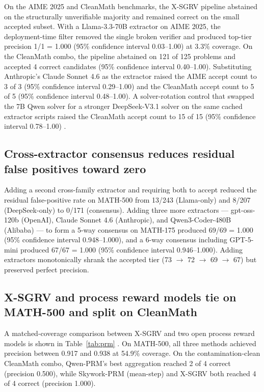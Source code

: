 \documentclass[11pt]{article}
\begin{document}
On the AIME 2025 and CleanMath benchmarks, the X-SGRV pipeline abstained on the structurally unverifiable majority and remained correct on the small accepted subset. With a Llama-3.3-70B extractor on AIME 2025, the deployment-time filter removed the single broken verifier and produced top-tier precision 1/1 = 1.000 (95\% confidence interval 0.03--1.00) at 3.3\% coverage. On the CleanMath combo, the pipeline abstained on 121 of 125 problems and accepted 4 correct candidates (95\% confidence interval 0.40--1.00). Substituting Anthropic's Claude Sonnet 4.6 as the extractor raised the AIME accept count to 3 of 3 (95\% confidence interval 0.29--1.00) and the CleanMath accept count to 5 of 5 (95\% confidence interval 0.48--1.00). A solver-rotation control that swapped the 7B Qwen solver for a stronger DeepSeek-V3.1 solver on the same cached extractor scripts raised the CleanMath accept count to 15 of 15 (95\% confidence interval 0.78--1.00) \citep{deepseek2025r1}.

\subsection{Cross-extractor consensus reduces residual false positives toward zero}

Adding a second cross-family extractor and requiring both to accept reduced the residual false-positive rate on MATH-500 from 13/243 (Llama-only) and 8/207 (DeepSeek-only) to 0/171 (consensus). Adding three more extractors --- gpt-oss-120b (OpenAI), Claude Sonnet 4.6 (Anthropic), and Qwen3-Coder-480B (Alibaba) --- to form a 5-way consensus on MATH-175 produced 69/69 = 1.000 (95\% confidence interval 0.948--1.000), and a 6-way consensus including GPT-5-mini produced 67/67 = 1.000 (95\% confidence interval 0.946--1.000). Adding extractors monotonically shrank the accepted tier (73 $\to$ 72 $\to$ 69 $\to$ 67) but preserved perfect precision.

\subsection{X-SGRV and process reward models tie on MATH-500 and split on CleanMath}

A matched-coverage comparison between X-SGRV and two open process reward models is shown in Table~\ref{tab:prm} \citep{qwenprm2025, skyworkprm2024}. On MATH-500, all three methods achieved precision between 0.917 and 0.938 at 54.9\% coverage. On the contamination-clean CleanMath combo, Qwen-PRM's best aggregation reached 2 of 4 correct (precision 0.500), while Skywork-PRM (mean-step) and X-SGRV both reached 4 of 4 correct (precision 1.000).
\end{document}
